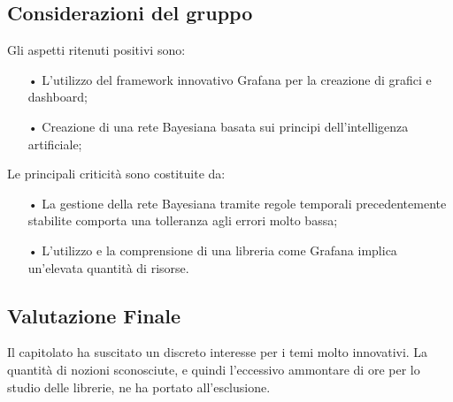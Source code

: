 \subsection{Considerazioni del gruppo}


Gli aspetti ritenuti positivi sono: 
\begin{itemize}
\item[•] L'utilizzo del framework innovativo Grafana per la creazione di grafici e dashboard;
\item[•] Creazione di una rete Bayesiana basata sui principi dell'intelligenza artificiale;
\end{itemize}

Le principali criticità sono costituite da: 
\begin{itemize}

\item[•]La gestione della rete Bayesiana tramite regole temporali precedentemente stabilite comporta una tolleranza agli errori molto bassa;

\item[•] L'utilizzo e la comprensione di una libreria come Grafana implica un'elevata quantità di risorse.
\end{itemize}

\subsection{Valutazione Finale}
Il capitolato ha suscitato un discreto interesse per i temi molto innovativi. 
La quantità di nozioni sconosciute, e quindi l'eccessivo ammontare di ore per lo studio delle librerie, ne ha portato all'esclusione. 
